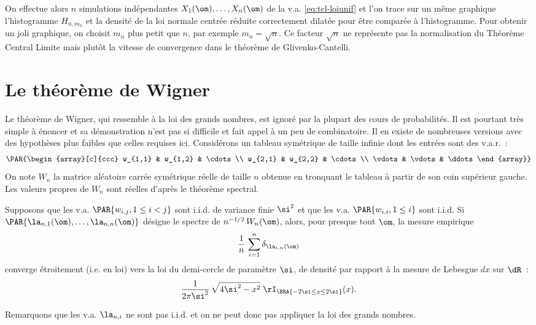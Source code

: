 On effectue alors $n$ simulations indépendantes $X_1(\om),\ldots,X_n(\om)$ de la
v.a. \eqref{eq:tcl-loiunif} et l'on trace sur un même graphique l'histogramme
$H_{n,m_n}$ et la densité de la loi normale centrée réduite correctement
dilatée pour être comparée à l'histogramme. Pour obtenir un joli graphique, on
choisit $m_n$ plus petit que $n$, par exemple $m_n=\sqrt{n}$. Ce facteur
$\sqrt{n}$ ne représente pas la normalisation du Théorème Central Limite mais
plutôt la vitesse de convergence dans le théorème de Glivenko-Cantelli. 

%
%
%

%
\section{Le théorème de Wigner}
%

Le théorème de Wigner, qui ressemble à la loi des grands nombres, est ignoré
par la plupart des cours de probabilités. Il est pourtant très simple à
énoncer et sa démonstration n'est pas si difficile et fait appel à un peu de
combinatoire. Il en existe de nombreuses versions avec des hypothèses plus
faibles que celles requises ici.
Considérons un tableau symétrique de taille infinie dont les entrées sont des
v.a.r.~:
$$
\PAR{\begin{array}[c]{ccc}
 w_{1,1} & w_{1,2} & \cdots \\
 w_{2,1} & w_{2,2} & \cdots \\
 \vdots     & \vdots    & \ddots 
\end{array}}
$$
On note $W_n$ la matrice aléatoire carrée symétrique réelle de taille $n$
obtenue en tronquant le tableau à partir de son coin supérieur gauche. 
Les valeurs propres de $W_n$ sont réelles
d'après le théorème spectral.

\begin{theorem}[Wigner]
  Supposons que les v.a. $\PAR{w_{i,j},1\leq i<j}$ sont i.i.d. de variance finie
  $\si^2$ et que les v.a. $\PAR{w_{i,i},1\leq i}$ sont i.i.d.  Si
  $\PAR{\la_{n,1}(\om),\ldots,\la_{n,n}(\om)}$ désigne le spectre de
  $n^{-1/2}\,W_n(\om)$, alors, pour presque tout $\om$, la mesure empirique
  $$
  \frac{1}{n}\,\sum_{i=1}^n\delta_{\la_{i,n}(\om)}
  $$
  converge étroitement (i.e. en loi) vers la loi du demi-cercle de
  paramètre $\si$, de densité par rapport à la mesure de Lebesgue $dx$ sur $\dR$~:
  $$
  \frac{1}{2\pi\si^2}\,\sqrt{4\si^2-x^2}\;\rI_{\BRA{-2\si\leq x \leq 2\si}}(x).
  $$
\end{theorem}
Remarquons que les v.a. $\la_{n,i}$ ne sont pas i.i.d. et on ne peut donc pas
appliquer la loi des grands nombres. 


